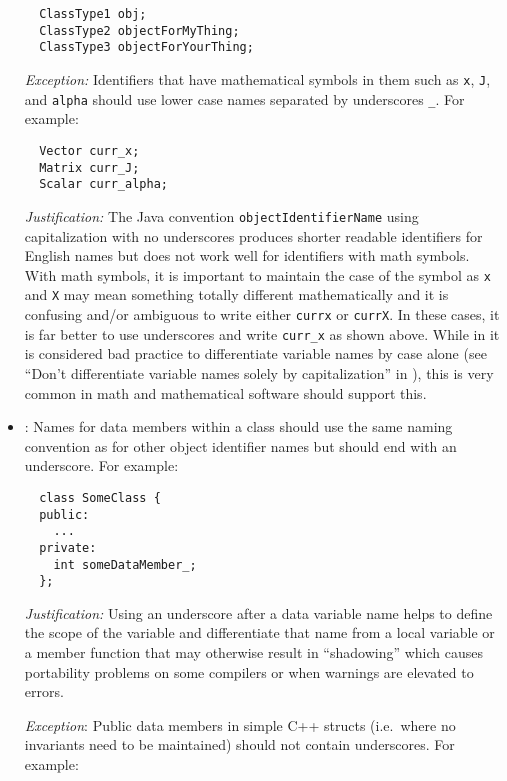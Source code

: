 \begin{itemize}
{\small\begin{verbatim}
  ClassType1 obj;
  ClassType2 objectForMyThing;
  ClassType3 objectForYourThing;
\end{verbatim}}


{}\textit{Exception:} Identifiers that have mathematical symbols in them such
as {}\texttt{x}, {}\texttt{J}, and {}\texttt{alpha} should use lower case
names separated by underscores {}\texttt{\_}.  For example:

{\small\begin{verbatim}
  Vector curr_x;
  Matrix curr_J;
  Scalar curr_alpha;
\end{verbatim}}


{}\textit{Justification:} The Java convention {}\texttt{objectIdentifierName}
using capitalization with no underscores produces shorter readable identifiers
for English names but does not work well for identifiers with math symbols.
With math symbols, it is important to maintain the case of the symbol as
{}\texttt{x} and {}\texttt{X} may mean something totally different
mathematically and it is confusing and/or ambiguous to write either
{}\texttt{currx} or {}\texttt{currX}.  In these cases, it is far better to use
underscores and write {}\texttt{curr\_x} as shown above.  While in it is
considered bad practice to differentiate variable names by case alone (see
``Don't differentiate variable names solely by capitalization'' in
{}\cite[Section 11.7]{CodeComplete2nd04}), this is very common in math and
mathematical software should support this.


{}\item\NCDataMemberNames: Names for data members within a class should use the
same naming convention as for other object identifier names but should end
with an underscore.  For example:

{\small\begin{verbatim}
  class SomeClass {
  public:
    ...
  private:
    int someDataMember_;
  };
\end{verbatim}}


{}\textit{Justification:} Using an underscore after a data variable
name helps to define the scope of the variable and differentiate that
name from a local variable or a member function that may otherwise
result in ``shadowing'' which causes portability problems on some
compilers or when warnings are elevated to errors.


{}\textit{Exception}: Public data members in simple C++ structs (i.e.\
where no invariants need to be maintained) should not contain
underscores.  For example:


\end{itemize}
